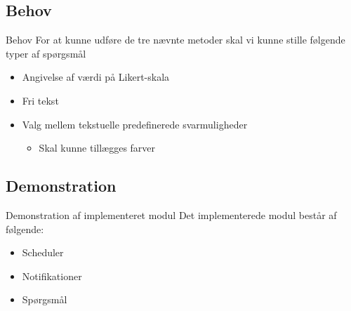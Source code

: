 \subsection{Behov}
{\aauwavesbg%
\begin{frame}{Behov} %
For at kunne udføre de tre nævnte metoder skal vi kunne stille følgende typer af spørgsmål


\begin{itemize}
	\item Angivelse af værdi på Likert-skala
	\item Fri tekst
	\item Valg mellem tekstuelle predefinerede svarmuligheder
	\begin{itemize}
		\item Skal kunne tillægges farver
	\end{itemize}
\end{itemize}
\end{frame}}

\subsection{Demonstration}
{\aauwavesbg%
\begin{frame}{Demonstration af implementeret modul} %
	Det implementerede modul består af følgende:
	\begin{itemize}
		\item Scheduler
		\item Notifikationer
		\item Spørgsmål
	\end{itemize}
\end{frame}}
